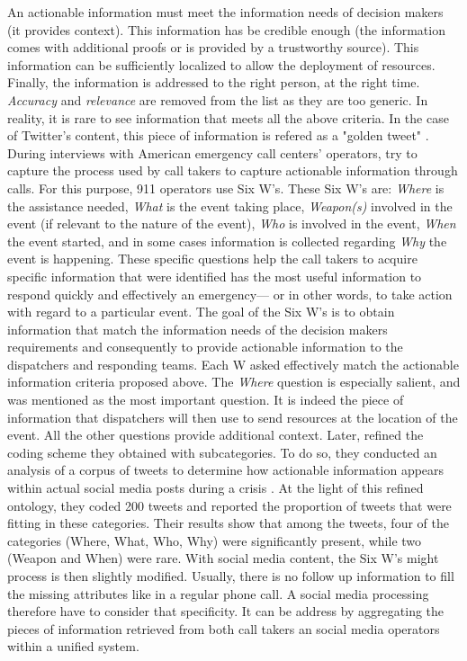 An actionable information must meet the information needs of decision makers (it provides context).
This information has be credible enough (the information comes with additional proofs or is provided by a trustworthy source).
This information can be sufficiently localized to allow the deployment of resources.
Finally, the information is addressed to the right person, at the right time.
\textit{Accuracy} and \textit{relevance} are removed from the list as they are too generic.
In reality, it is rare to see information that meets all the above criteria.
In the case of Twitter's content, this piece of information is refered as a "golden tweet" \parencite{kropczynskiIdentifyingActionableInformation2018}.
During interviews with American emergency call centers' operators, \textcite{kropczynskiIdentifyingActionableInformation2018}
try to capture the process used by call takers to capture actionable information through calls.
For this purpose, 911 operators use Six W's.
These Six W's are: \textit{Where} is the assistance needed, \textit{What} is the event taking place,
\textit{Weapon(s)} involved in the event (if relevant to the nature of the event),
\textit{Who} is involved in the event, \textit{When} the event started,
and in some cases information is collected regarding \textit{Why} the event is happening.
These specific questions help the call takers to acquire specific information that were
identified has the most useful information to respond quickly and effectively an emergency—
or in other words, to take action with regard to a particular event.
The goal of the Six W's is to obtain information that match the information needs of the decision makers requirements and consequently to provide actionable information to the dispatchers and responding teams.
Each W asked effectively match the actionable information criteria proposed above.
The \textit{Where} question is especially salient, and was mentioned as the most important question.
It is indeed the piece of information that dispatchers will then use to send resources at the location of the event.
All the other questions provide additional context.
Later, \citeauthor{kropczynskiIdentifyingActionableInformation2018} refined the coding scheme they obtained with subcategories.
To do so, they conducted an analysis of a corpus of tweets to determine how actionable information appears within actual social media posts during a crisis \parencite{kropczynskiRefiningCodingScheme2019}.
At the light of this refined ontology, they coded 200 tweets and reported the proportion of tweets that were fitting in these categories.
Their results show that among the tweets, four of the categories (Where, What, Who, Why) were significantly present, while two (Weapon and When) were rare.
With social media content, the Six W's might process is then slightly modified.
Usually, there is no follow up information to fill the missing attributes like in a regular phone call.
A social media processing therefore have to consider that specificity.
It can be address by aggregating the pieces of information retrieved from both call takers an social media operators within a unified system.

